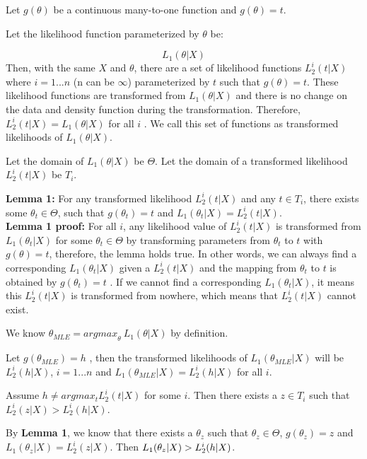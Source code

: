 \documentclass[twoside,11pt]{homework}
\begin{document}
Let $g(\theta)$ be a continuous many-to-one function and $g(\theta) = t$.

Let the likelihood function parameterized by $\theta$ be:

\begin{equation*}
    L_{1}(\theta|X)
\end{equation*}Then, with the same $X$ and $\theta$, there are a set of likelihood functions $L_{2}^{i}(t|X)$ where $i = 1...n$ (n can be $\infty$) parameterized by $t$ such that $g(\theta) =t$. These likelihood functions are transformed from $L_{1}(\theta|X)$ and there is no change on the data and density function during the transformation. Therefore, $L_{2}^{i}(t|X) = L_{1}(\theta|X)$ for all $i$ . We call this set of functions as transformed likelihoods of $L_{1}(\theta|X)$. 

Let the domain of $L_{1}(\theta|X)$ be $\Theta$. Let the domain of a transformed likelihood $L_{2}^{i}(t|X)$  be $T_i$. 

\noindent \textbf{Lemma 1: } For any transformed likelihood $L_{2}^{i}(t|X)$ and any $t \in T_i$, there exists some $\theta_{t} \in \Theta$, such that $g(\theta_{t}) = t$ and  $L_{1}(\theta_t|X) = L_{2}^{i}(t|X)$. \\
\noindent \textbf{Lemma 1 proof: } For all $i$, any likelihood value of $L_{2}^{i}(t|X)$ is transformed from $L_{1}(\theta_t|X)$ for some $\theta_t \in \Theta$ by transforming parameters from $\theta_t$ to $t$ with $g(\theta) = t$, therefore, the lemma holds true. In other words, we can always find a corresponding $L_{1}(\theta_t|X)$ given a $L_{2}^{i}(t|X)$ and the mapping from $\theta_t$ to $t$ is obtained by $g(\theta_t) = t$ . If we cannot find a corresponding $L_{1}(\theta_t|X)$, it means this $L_{2}^{i}(t|X)$ is transformed from nowhere, which means that $L_{2}^{i}(t|X)$ cannot exist. 

We know $\theta_{MLE} = {argmax}_{\theta}~L_{1}(\theta|X)$ by definition. 

Let $g(\theta_{MLE}) = h$ , then the transformed likelihoods of $L_{1}(\theta_{MLE}|X)$ will be $L_2^i(h|X)$,  $i = 1...n$ and $L_{1}(\theta_{MLE}|X) = L_2^i(h|X)$ for all $i$. 

Assume $ h \neq argmax_{t}L_{2}^{i}(t|X)$ for some $i$. Then there exists a $z \in T_i$ such that $L_{2}^{i}(z|X) > L_{2}^{i}(h|X)$. 

By \textbf{Lemma 1}, we know that there exists a $\theta_z$ such that $\theta_{z} \in \Theta$,  $g(\theta_{z}) = z$ and  $L_{1}(\theta_z|X) = L_{2}^{i}(z|X)$. Then $L_{1}(\theta_z|X) > L_{2}^{i}(h|X) \\$. 
\end{document}
